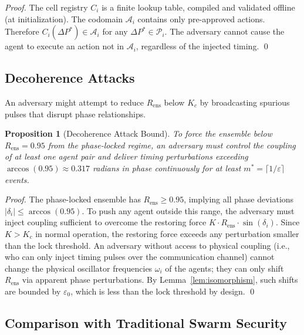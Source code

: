 \documentclass[twocolumn,10pt]{article}
\newtheorem{proposition}[theorem]{Proposition}
\newcommand{\Rens}{R_{\mathrm{ens}}}
\newcommand{\Kc}{K_c}
\newcommand{\DeltaP}{\Delta P}
\begin{document}
\begin{proof}
The cell registry $C_i$ is a finite lookup table, compiled and validated
offline (at initialization). The codomain $\mathcal{A}_i$ contains only
pre-approved actions. Therefore $C_i(\DeltaP^*) \in \mathcal{A}_i$ for any
$\DeltaP^* \in \mathcal{P}_i$. The adversary cannot cause the agent to execute
an action not in $\mathcal{A}_i$, regardless of the injected timing. \qed
\end{proof}

\subsection{Decoherence Attacks}

An adversary might attempt to reduce $\Rens$ below $\Kc$ by broadcasting
spurious pulses that disrupt phase relationships.

\begin{proposition}[Decoherence Attack Bound]
\label{prop:decoherence_attack}
To force the ensemble below $\Rens = 0.95$ from the phase-locked regime, an
adversary must control the coupling of \emph{at least one agent pair} and
deliver timing perturbations exceeding $\arccos(0.95) \approx 0.317$ radians
in phase continuously for at least $m^* = \lceil 1/\varepsilon \rceil$ events.
\end{proposition}

\begin{proof}
The phase-locked ensemble has $\Rens \geq 0.95$, implying all phase deviations
$|\delta_i| \leq \arccos(0.95)$. To push any agent outside this range, the
adversary must inject coupling sufficient to overcome the restoring force
$K \cdot \Rens \cdot \sin(\delta_i)$. Since $K > \Kc$ in normal operation,
the restoring force exceeds any perturbation smaller than the lock threshold.
An adversary without access to physical coupling (i.e., who can only inject
timing pulses over the communication channel) cannot change the physical
oscillator frequencies $\omega_i$ of the agents; they can only shift $\Rens$
via apparent phase perturbations. By Lemma~\ref{lem:isomorphism}, such shifts
are bounded by $\varepsilon_0$, which is less than the lock threshold by
design. \qed
\end{proof}

\subsection{Comparison with Traditional Swarm Security}
\end{document}
